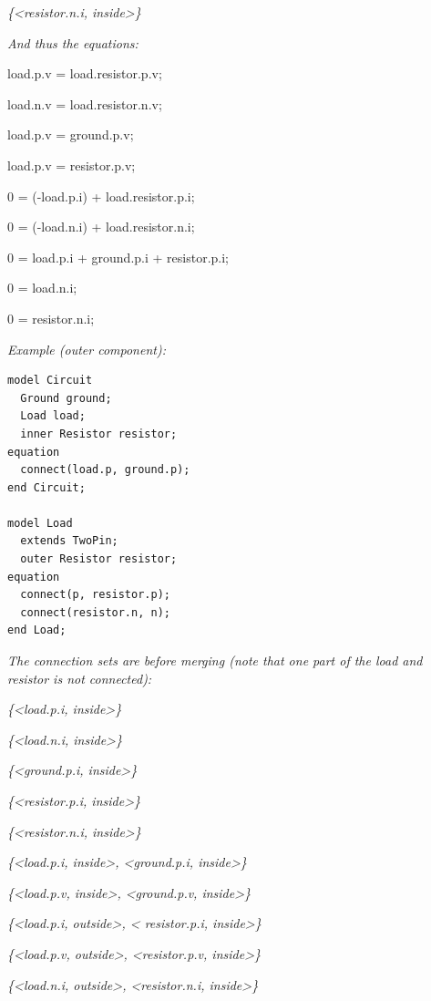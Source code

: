 \documentclass[10pt,a4paper]{report}
\begin{document}
\emph{\{\textless{}resistor.n.i, inside\textgreater{}\}}

\emph{And thus the equations:}

load.p.v = load.resistor.p.v;

load.n.v = load.resistor.n.v;

load.p.v = ground.p.v;

load.p.v = resistor.p.v;

0 = (-load.p.i) + load.resistor.p.i;

0 = (-load.n.i) + load.resistor.n.i;

0 = load.p.i + ground.p.i + resistor.p.i;

0 = load.n.i;

0 = resistor.n.i;

\emph{Example (outer component):}

\begin{lstlisting}[language=modelica]
model Circuit
  Ground ground;
  Load load;
  inner Resistor resistor;
equation
  connect(load.p, ground.p);
end Circuit;

model Load
  extends TwoPin;
  outer Resistor resistor;
equation
  connect(p, resistor.p);
  connect(resistor.n, n);
end Load;
\end{lstlisting}
\emph{The connection sets are before merging (note that one part of the
load and resistor is not connected):}

\emph{\{\textless{}load.p.i, inside\textgreater{}\}}

\emph{\{\textless{}load.n.i, inside\textgreater{}\}}

\emph{\{\textless{}ground.p.i, inside\textgreater{}\}}

\emph{\{\textless{}resistor.p.i, inside\textgreater{}\}}

\emph{\{\textless{}resistor.n.i, inside\textgreater{}\}}

\emph{\{\textless{}load.p.i, inside\textgreater{},
\textless{}ground.p.i, inside\textgreater{}\}}

\emph{\{\textless{}load.p.v, inside\textgreater{},
\textless{}ground.p.v, inside\textgreater{}\}}

\emph{\{\textless{}load.p.i, outside\textgreater{}, \textless{}
resistor.p.i, inside\textgreater{}\}}

\emph{\{\textless{}load.p.v, outside\textgreater{},
\textless{}resistor.p.v, inside\textgreater{}\}}

\emph{\{\textless{}load.n.i, outside\textgreater{},
\textless{}resistor.n.i, inside\textgreater{}\}}
\end{document}
